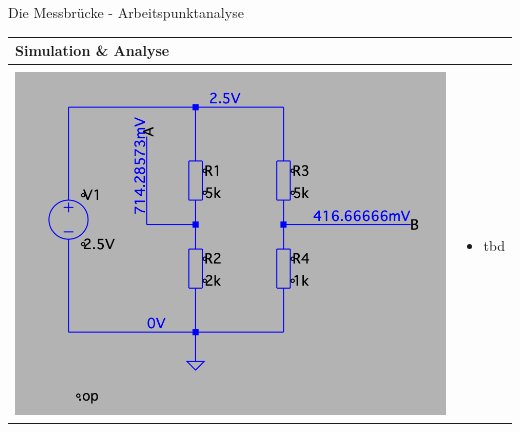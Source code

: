 \begin{frame}[t]{Die Messbrücke - Arbeitspunktanalyse} 
    
    \begin{spacing}{0.9} \begin{tiny}
    \begin{table}[h!]
      \begin{tabular}{p{3cm} p{7cm}}
        \hline
        \textbf{Simulation \& Analyse} & \\
        \hline \\
        \begin{minipage}{.3\textwidth}
         \includegraphics[width=\linewidth]{pictures/bridge_op_1.png}
       \end{minipage} 
       & 
       \begin{minipage}{.7\textwidth}
       \begin{itemize}
         \item tbd
       \end{itemize}
       \end{minipage} 
       \\
      \end{tabular}
    \end{table}
  \end{tiny} \end{spacing}
  

     \end{frame}